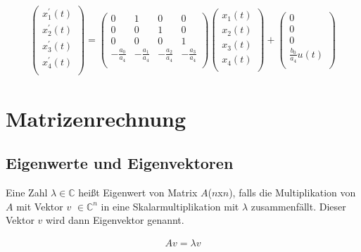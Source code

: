 \documentclass[10pt,a4paper]{article}
\begin{document}
  \begin{mdframed}[style=exercise]
    \begin{align}
        \begin{pmatrix}
        x_1^{'}(t) \\
        x_2^{'}(t) \\
        x_3^{'}(t) \\
        x_4^{'}(t) \\
        \end{pmatrix} 
        =
        \begin{pmatrix}
            0 & 1 & 0 & 0 \\
            0 & 0 & 1 & 0 \\
            0 & 0 & 0 & 1 \\
            -\frac{a_0}{a_4} & -\frac{a_1}{a_4} & -\frac{a_2}{a_4} &  -\frac{a_3}{a_4}\\
        \end{pmatrix}
        \begin{pmatrix}
        x_1(t) \\
        x_2(t) \\
        x_3(t) \\
        x_4(t) \\
        \end{pmatrix} 
        +
        \begin{pmatrix}
        0 \\
        0 \\
        0 \\
        \frac{b_0}{a_4}u(t) \\
        \end{pmatrix} 
    \end{align}
  \end{mdframed}


\newpage
\section{Matrizenrechnung}
\subsection{Eigenwerte und Eigenvektoren}
Eine Zahl $\lambda \in \mathbb{C}$ heißt Eigenwert von Matrix $A$($n$x$n$),
falls die Multiplikation von $A$ mit Vektor $v$ $\in \mathbb{C}^n$ in eine Skalarmultiplikation
mit $\lambda$ zusammenfällt. Dieser Vektor $v$ wird dann Eigenvektor genannt.
  \begin{mdframed}[style=exercise]
    \begin{align}
        Av = \lambda v
    \end{align}
  \end{mdframed}
\end{document}
